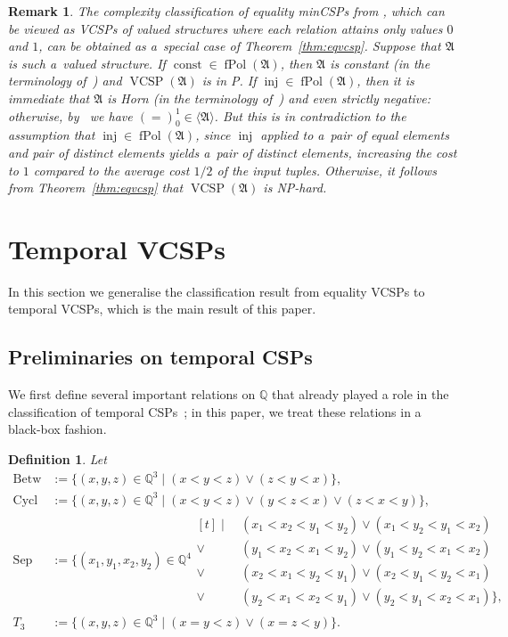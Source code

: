 \documentclass[preprint,12pt]{elsarticle}
\newcommand{\Q}{\mathbb Q}
\newcommand{\bA}{{\mathfrak A}}
\DeclareMathOperator{\Cyc}{Cycl}
\DeclareMathOperator{\fPol}{fPol}
\DeclareMathOperator{\vcsp}{VCSP}
\DeclareMathOperator{\inj}{inj}
\DeclareMathOperator{\const}{const}
\DeclareMathOperator{\Betw}{Betw}
\DeclareMathOperator{\Sep}{Sep}
\newtheorem{definition}[theorem]{Definition}
\newtheorem{remark}[theorem]{Remark}
\begin{document}
\begin{remark}
The complexity classification of equality minCSPs from \cite{equalityminCSP}, which can be viewed as VCSPs of valued structures where each relation attains only values $0$ and $1$, can be obtained as a~special case of Theorem~\ref{thm:eqvcsp}. Suppose that $\bA$ is such a~valued structure. If $\const \in \fPol(\bA)$, then $\bA$ is constant (in the terminology of~\cite{equalityminCSP}) and $\vcsp(\bA)$ is in P. 
If $\inj \in \fPol(\bA)$, then it is immediate that $\bA$ is Horn (in the terminology of~\cite{equalityminCSP}) and 
even strictly negative: otherwise, by~\cite[Lemma 16]{equalityminCSP} we have $(=)_0^1 \in \langle \bA \rangle$. But this is in contradiction to the assumption that 
$\inj \in \fPol(\bA)$, since $\inj$ applied to a~pair of equal elements and pair of distinct elements yields a~pair of
distinct elements,
increasing the cost to $1$ compared to the average cost $1/2$ of the input tuples.
Otherwise, it follows from Theorem~\ref{thm:eqvcsp} that $\vcsp(\bA)$ is NP-hard.
\end{remark}


\section{Temporal VCSPs}\label{sect:temp}
In this section we generalise the classification result from equality VCSPs to temporal VCSPs, which is the main result of this paper.

\subsection{Preliminaries on temporal CSPs} 
We first define several important relations on $\Q$  that already played a role  in the classification of temporal CSPs~\cite{tcsps-journal}; in this paper, we treat these relations in a black-box fashion. 
\begin{definition}
\label{def:rels}
Let
\begin{align*}
\Betw &:= \{(x,y,z) \in \Q^3 \mid (x<y<z) \vee (z<y<x) \}, \\
\Cyc &:= \{(x,y,z) \in \Q^3 \mid (x<y<z) \vee (y<z<x) \vee (z<x<y)\}, \\
\Sep &:= \{(x_1,y_1,x_2,y_2) \in \Q^4 
  \begin{aligned}[t]
    \mid~&(x_1 < x_2 < y_1 < y_2) \vee  (x_1 < y_2 < y_1 < x_2) \\
    \vee~&(y_1 < x_2 < x_1 < y_2)
    \vee (y_1 < y_2 < x_1 < x_2) \\
    \vee~&(x_2 < x_1 < y_2 < y_1) \vee  (x_2 < y_1 < y_2 < x_1) \\
    \vee~&(y_2 < x_1 < x_2 < y_1) \vee (y_2 < y_1 < x_2 < x_1) \},
  \end{aligned} \\
T_3 &:= \{(x,y,z) \in \Q^3 \mid (x=y<z) \vee (x=z<y)\}.
\end{align*}
\end{definition}
\end{document}
